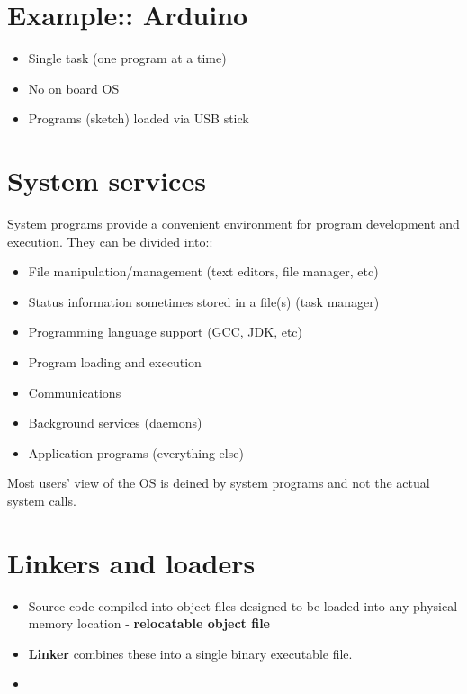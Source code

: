\documentclass[12pt]{book}
\begin{document}
\section*{Example:: Arduino}

\begin{itemize}
    \item Single task (one program at a time)
    \item No on board OS
    \item Programs (sketch) loaded via USB stick

\end{itemize}

\section*{System services}
System programs provide a convenient environment for program development and execution. They can be divided into::

\begin{itemize}
    \item File manipulation/management (text editors, file manager, etc)
    \item Status information sometimes stored in a file(s) (task manager)
    \item Programming language support (GCC, JDK, etc)
    \item Program loading and execution
    \item Communications
    \item Background services (daemons)
    \item Application programs (everything else)
\end{itemize}

Most users' view of the OS is deined by system programs and not the actual system calls.

\section*{Linkers and loaders}

\begin{itemize}
    \item Source code compiled into object files designed to be loaded into any physical memory location - \textbf{relocatable object file}
    \item \textbf{Linker} combines these into a single binary executable file.
    \item 
\end{itemize}
\end{document}
